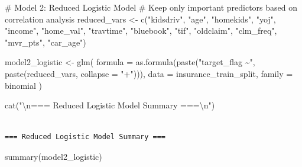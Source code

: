 \documentclass[
  11pt]{article}
\newenvironment{Shaded}{\begin{snugshade}}{\end{snugshade}}
\newcommand{\AttributeTok}[1]{\textcolor[rgb]{0.40,0.45,0.13}{#1}}
\newcommand{\CommentTok}[1]{\textcolor[rgb]{0.37,0.37,0.37}{#1}}
\newcommand{\FunctionTok}[1]{\textcolor[rgb]{0.28,0.35,0.67}{#1}}
\newcommand{\NormalTok}[1]{\textcolor[rgb]{0.00,0.23,0.31}{#1}}
\newcommand{\OtherTok}[1]{\textcolor[rgb]{0.00,0.23,0.31}{#1}}
\newcommand{\SpecialCharTok}[1]{\textcolor[rgb]{0.37,0.37,0.37}{#1}}
\newcommand{\StringTok}[1]{\textcolor[rgb]{0.13,0.47,0.30}{#1}}
\begin{document}
\begin{Shaded}
\begin{Highlighting}[]
\CommentTok{\# Model 2: Reduced Logistic Model}
\CommentTok{\# Keep only important predictors based on correlation analysis}
\NormalTok{reduced\_vars }\OtherTok{\textless{}{-}} \FunctionTok{c}\NormalTok{(}\StringTok{"kidsdriv"}\NormalTok{, }\StringTok{"age"}\NormalTok{, }\StringTok{"homekids"}\NormalTok{, }\StringTok{"yoj"}\NormalTok{, }\StringTok{"income"}\NormalTok{, }\StringTok{"home\_val"}\NormalTok{,}
                  \StringTok{"travtime"}\NormalTok{, }\StringTok{"bluebook"}\NormalTok{, }\StringTok{"tif"}\NormalTok{, }\StringTok{"oldclaim"}\NormalTok{, }\StringTok{"clm\_freq"}\NormalTok{, }\StringTok{"mvr\_pts"}\NormalTok{, }\StringTok{"car\_age"}\NormalTok{)}

\NormalTok{model2\_logistic }\OtherTok{\textless{}{-}} \FunctionTok{glm}\NormalTok{(}
    \AttributeTok{formula =} \FunctionTok{as.formula}\NormalTok{(}\FunctionTok{paste}\NormalTok{(}\StringTok{"target\_flag \textasciitilde{}"}\NormalTok{, }\FunctionTok{paste}\NormalTok{(reduced\_vars, }\AttributeTok{collapse =} \StringTok{"+"}\NormalTok{))),}
    \AttributeTok{data =}\NormalTok{ insurance\_train\_split,}
    \AttributeTok{family =}\NormalTok{ binomial}
\NormalTok{)}

\FunctionTok{cat}\NormalTok{(}\StringTok{"}\SpecialCharTok{\textbackslash{}n}\StringTok{=== Reduced Logistic Model Summary ===}\SpecialCharTok{\textbackslash{}n}\StringTok{"}\NormalTok{)}
\end{Highlighting}
\end{Shaded}

\begin{verbatim}

=== Reduced Logistic Model Summary ===
\end{verbatim}

\begin{Shaded}
\begin{Highlighting}[]
\FunctionTok{summary}\NormalTok{(model2\_logistic)}
\end{Highlighting}
\end{Shaded}
\end{document}
